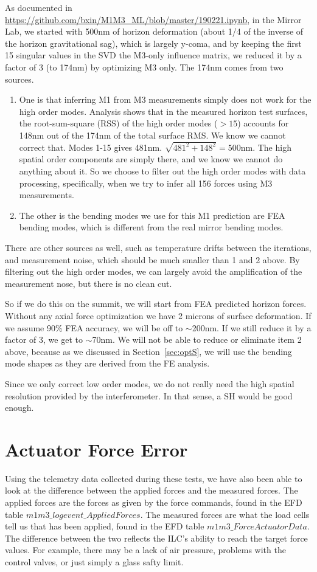 \documentclass [twoside,openbib,12pt]{article}
\newcommand{\bnum}{\begin{enumerate}}
\newcommand{\enum}{\end{enumerate}}
\begin{document}
As documented in \url{https://github.com/bxin/M1M3_ML/blob/master/190221.ipynb},
in the Mirror Lab, we started with 500nm of horizon deformation (about
1/4 of the inverse of the horizon gravitational sag), which is largely
y-coma, and by keeping the first 15 singular values in the SVD the M3-only
influence matrix, we reduced it by a factor of 3 (to 174nm) by optimizing M3
only.
The 174nm comes from two sources.
\bnum
\item One is that inferring M1 from M3 measurements simply does not work for the high order modes.
Analysis shows that in the measured horizon test surfaces, the
root-sum-square (RSS) of the high order modes ($>15$) accounts
for 148nm out of the 174nm of the total surface RMS.
We know we cannot correct that. Modes 1-15
gives 481nm.
$\sqrt{481^2+148^2}=500$nm.
The high spatial order components are simply there, and we know we
cannot do anything about it. So we choose to 
 filter out the high order modes with data processing, specifically,
 when we try to infer all 156 forces using M3 measurements.
\item
The other is the bending modes we use for this M1 prediction are FEA
bending modes, which is different from the real mirror bending modes.
\enum
There are other sources as well, such as temperature drifts between
the iterations, and measurement noise, which should be much smaller
than 1 and 2 above. By filtering out the high order modes, we can
largely avoid the amplification of the measurement nose, but there is
no clean cut.

So if we do this on the summit, we will start from FEA predicted
horizon forces. Without any axial force optimization we have 2 microns
of surface deformation. If we assume 90\% FEA accuracy, we will be off
to $\sim$200nm. If we still reduce it by a factor of 3, we get to
$\sim$70nm.
We will not be able to reduce or eliminate item 2 above, because as
we discussed in Section~\ref{sec:optS}, we will use the bending mode
shapes as they are derived from the FE analysis.

Since we only correct low order modes, we do not really need the high
spatial resolution provided by the interferometer. In that sense, a SH
would be good enough. 

\section{Actuator Force Error}
\label{sec:ferror}

Using the telemetry data collected during these tests, we have also
been able to look at the difference between the applied forces and the
measured forces.
The applied forces are the forces as given by the force commands,
found in the EFD table $m1m3\_logevent\_AppliedForces$.
The measured forces are what the load cells tell us that has been
applied, found in the EFD table $m1m3\_ForceActuatorData$.
The difference between the two reflects the ILC's ability to reach the
target force values. For example, there may be a lack of air pressure, problems
with the control valves, or just simply a glass safty limit.
\end{document}
